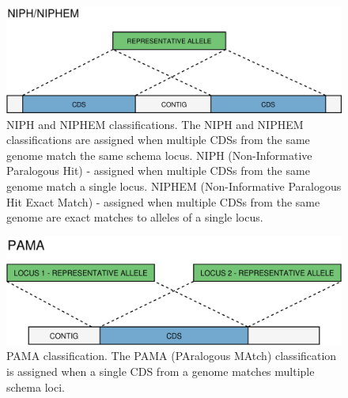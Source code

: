 \newpage
\begin{figure}[h!]
    \centering
    \includegraphics[angle=0,width=\textwidth]{figures/chapter 2/FigureS2.pdf}
    \caption{NIPH and NIPHEM classifications. The NIPH and NIPHEM classifications are assigned when multiple CDSs from the same genome match the same schema locus. NIPH (Non-Informative Paralogous Hit) - assigned when multiple CDSs from the same genome match a single locus. NIPHEM (Non-Informative Paralogous Hit Exact Match) - assigned when multiple CDSs from the same genome are exact matches to alleles of a single locus.}
    \label{fig:chap2_figureS2}
\end{figure}

\newpage
\begin{figure}[h!]
    \centering
    \includegraphics[angle=0,width=\textwidth]{figures/chapter 2/FigureS3.pdf}
    \caption{PAMA classification. The PAMA (PAralogous MAtch) classification is assigned when a single CDS from a genome matches multiple schema loci.}
    \label{fig:chap2_figureS3}
\end{figure}


